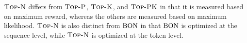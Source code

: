 \begin{remark}
$\textsc{Top-N}$ differs from $\textsc{Top-P}$, $\textsc{Top-K}$, and $\textsc{Top-PK}$ in that it is measured based on maximum reward, whereas the others are measured based on maximum likelihood. $\textsc{Top-N}$ is also distinct from $\text{{{BON}}}$ in that $\text{{{BON}}}$ is optimized at the sequence level, while $\textsc{Top-N}$ is optimized at the token level.
\end{remark}








































































